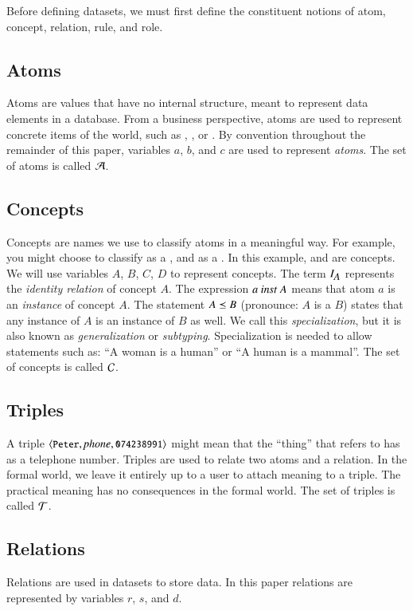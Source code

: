 \documentclass{elsarticle}
\begin{document}
	Before defining datasets, we must first define the constituent notions of atom, concept, relation, rule, and role.
\subsection{Atoms}
	Atoms are values that have no internal structure, meant to represent data elements in a database.
	From a business perspective, atoms are used to represent concrete items of the world,
	such as , , or .
	By convention throughout the remainder of this paper, variables $a$, $b$, and $c$ are used to represent \emph{atoms}.
	The set of atoms is called $\mathcal{A}$.
	
\subsection{Concepts}
	Concepts are names we use to classify atoms in a meaningful way.
	For example, you might choose to classify  as a , and  as a .
	In this example,  and  are concepts.
    We will use variables $A$, $B$, $C$, $D$ to represent concepts.
	The term $I_{\text{\it \small A\/}}$ represents the \emph{identity relation} of concept $A$.
	The expression $a\ \text{\it inst\/}\ A$ means that atom $a$ is an \emph{instance} of concept $A$.
	The statement $A\preceq B$ (pronounce: $A$ is a $B$) states that any instance of $A$ is an instance of $B$ as well.
	We call this {\em specialization}, but it is also known as {\em generalization} or {\em subtyping}.
	Specialization is needed to allow statements such as: ``A woman is a human'' or ``A human is a mammal''.
	The set of concepts is called $\mathcal{C}$.
	
\subsection{Triples}
	A triple $\langle{\text{{\tt\small Peter}}},{\text{\it phone\/}},{\text{{\tt\small 074238991}}}\rangle$ might mean that the ``thing'' that  refers to
	has  as a telephone number.
	Triples are used to relate two atoms and a relation.
	In the formal world, we leave it entirely up to a user to attach meaning to a triple.
	The practical meaning has no consequences in the formal world.
	The set of triples is called $\mathcal{T}$.

\subsection{Relations}
	Relations are used in datasets to store data.
	In this paper relations are represented by variables $r$, $s$, and $d$.
\end{document}
